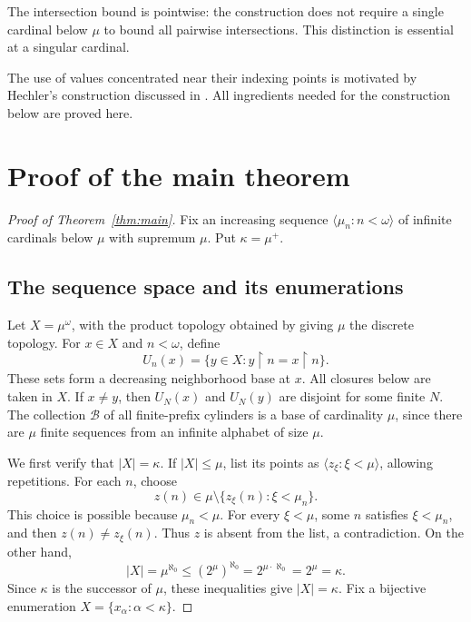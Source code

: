 \documentclass[10pt,leqno]{amsart}
\numberwithin{equation}{section}
\begin{document}
The intersection bound is pointwise: the construction does not require a
single cardinal below $\mu$ to bound all pairwise intersections. This
distinction is essential at a singular cardinal.

The use of values concentrated near their indexing points is motivated by
Hechler's construction discussed in \cite[p.~279]{EH}. All ingredients
needed for the construction below are proved here.

\section{Proof of the main theorem}

\begin{proof}[Proof of Theorem~\ref{thm:main}]
Fix an increasing sequence $\langle\mu_n:n<\omega\rangle$ of infinite
cardinals below $\mu$ with supremum $\mu$. Put $\kappa=\mu^+$.

\subsection{The sequence space and its enumerations}
Let $X=\mu^\omega$, with the product topology obtained by giving $\mu$ the
discrete topology. For $x\in X$ and $n<\omega$, define
\begin{equation}\label{eq:neighborhoods}
 U_n(x)=\{y\in X:y\mathbin{\upharpoonright}n=x\mathbin{\upharpoonright}n\}.
\end{equation}
These sets form a decreasing neighborhood base at $x$. All closures below
are taken in $X$. If $x\ne y$, then $U_N(x)$ and $U_N(y)$ are disjoint for
some finite $N$. The collection $\mathcal B$ of all finite-prefix cylinders
is a base of cardinality $\mu$, since there are $\mu$ finite sequences from
an infinite alphabet of size $\mu$.

We first verify that $|X|=\kappa$. If $|X|\leq\mu$, list its points as
$\langle z_\xi:\xi<\mu\rangle$, allowing repetitions. For each $n$, choose
\[
 z(n)\in\mu\setminus\{z_\xi(n):\xi<\mu_n\}.
\]
This choice is possible because $\mu_n<\mu$. For every $\xi<\mu$, some $n$
satisfies $\xi<\mu_n$, and then $z(n)\ne z_\xi(n)$. Thus $z$ is absent from
the list, a contradiction. On the other hand,
\begin{equation}\label{eq:cardX}
 |X|=\mu^{\aleph_0}\leq(2^\mu)^{\aleph_0}
      =2^{\mu\cdot\aleph_0}=2^\mu=\kappa.
\end{equation}
Since $\kappa$ is the successor of $\mu$, these inequalities give
$|X|=\kappa$. Fix a bijective enumeration
$X=\{x_\alpha:\alpha<\kappa\}$.


\end{proof}
\end{document}
